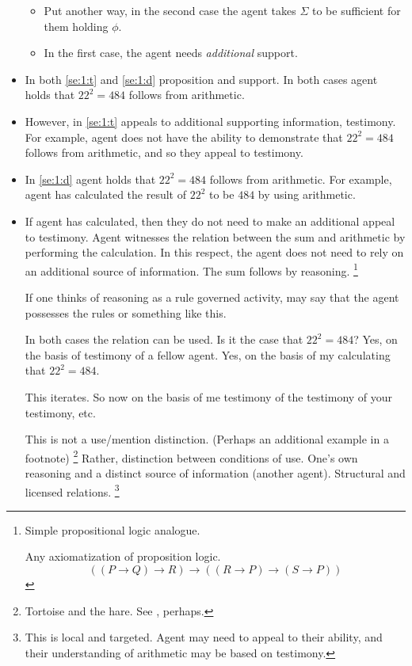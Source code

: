 \documentclass[10pt]{article}
\begin{document}
\begin{itemize}
{    \begin{itemize}
    \item Put another way, in the second case the agent takes \(\Sigma\) to be sufficient for them holding \(\phi\).
    \item In the first case, the agent needs \emph{additional} support.
    \end{itemize}
  }
\item In both \ref{se:1:t} and \ref{se:1:d} proposition and support.
  In both cases agent holds that \(22^{2} = 484\) follows from arithmetic.
\item However, in \ref{se:1:t} appeals to additional supporting information, testimony.
  For example, agent does not have the ability to demonstrate that \(22^{2} = 484\) follows from arithmetic, and so they appeal to testimony.
\item In \ref{se:1:d} agent holds that \(22^{2} = 484\) follows from arithmetic.
  For example, agent has calculated the result of \(22^{2}\) to be \(484\) by using arithmetic.
\item If agent has calculated, then they do not need to make an additional appeal to testimony.
  Agent witnesses the relation between the sum and arithmetic by performing the calculation.
  In this respect, the agent does not need to rely on an additional source of information.
  The sum follows by reasoning.\nolinebreak
  \footnote{
    Simple propositional logic analogue.

    Any axiomatization of proposition logic.
    \[
      ((P \rightarrow Q) \rightarrow R) \rightarrow ((R \rightarrow P) \rightarrow (S \rightarrow P))
    \]
    \cite{lukasiewicz:1948aa}
  }

  {
    \color{red}
    If one thinks of reasoning as a rule governed activity, may say that the agent possesses the rules or something like this.
  }

  In both cases the relation can be used.
  Is it the case that \(22^{2} = 484\)?
  Yes, on the basis of testimony of a fellow agent.
  Yes, on the basis of my calculating that \(22^{2} = 484\).

  This iterates.
  So now on the basis of me testimony of the testimony of your testimony, etc.

  This is not a use/mention distinction. (Perhaps an additional example in a footnote)\nolinebreak
  \footnote{
    Tortoise and the hare.
    See \cite{Simchen:2001aa}, perhaps.
  }
  Rather, distinction between conditions of use.
  One's own reasoning and a distinct source of information (another agent).
  Structural and licensed relations.\nolinebreak
  \footnote{
    This is local and targeted.
    Agent may need to appeal to their ability, and their understanding of arithmetic may be based on testimony.

}
\end{itemize}
\end{document}
